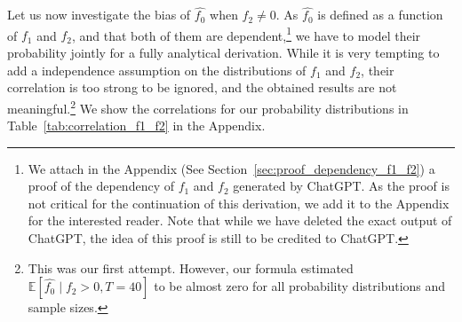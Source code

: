 Let us now investigate the bias of $\hat{f_0}$ when $f_2 \neq 0$. As $\hat{f_0}$ is defined as a function of $f_1$ and $f_2$, and that both of them are dependent,\!\footnote{We attach in the Appendix (See Section~\ref{sec:proof_dependency_f1_f2}) a proof of the dependency of $f_1$ and $f_2$ generated by ChatGPT.  As the proof is not critical for the continuation of this derivation, we add it to the Appendix for the interested reader. Note that while we have deleted the exact output of ChatGPT, the idea of this proof is still to be credited to ChatGPT.} we have to model their probability jointly for a fully analytical derivation.
While it is very tempting to add a independence assumption on the distributions of $f_1$ and $f_2$, their correlation is too strong to be ignored, and the obtained results are not meaningful.\!\footnote{This was our first attempt. However, our formula estimated $\mathbb{E}[\hat{f_0}\mid f_2 > 0, T=40]$ to be almost zero for all probability distributions and sample sizes.}
We show the correlations for our probability distributions in Table~\ref{tab:correlation_f1_f2} in the Appendix.


